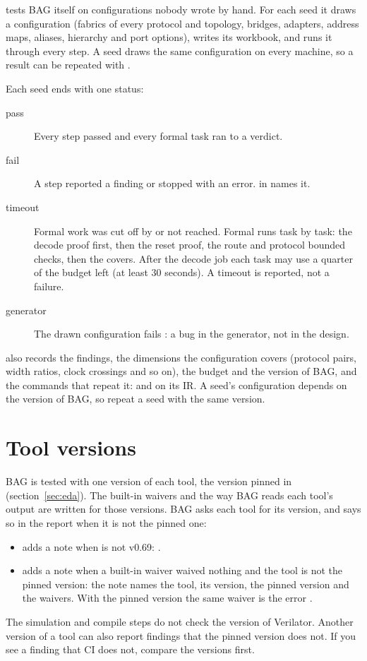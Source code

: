  tests BAG itself on configurations nobody wrote by hand. For each seed
it draws a configuration (fabrics of every protocol and topology, bridges, adapters,
address maps, aliases, hierarchy and port options), writes its workbook, and runs it
through every step. A seed draws the same configuration on every machine, so a result can
be repeated with .

Each seed ends with one status:

\begin{description}
\item[pass] Every step passed and every formal task ran to a verdict.
\item[fail] A step reported a finding or stopped with an error.  in
   names it.
\item[timeout] Formal work was cut off by  or not reached. Formal runs
  task by task: the decode proof first, then the reset proof, the route and protocol
  bounded checks, then the covers. After the decode job each task may use a quarter of the
  budget left (at least 30 seconds). A timeout is reported, not a failure.
\item[generator] The drawn configuration fails : a bug in the generator,
  not in the design.
\end{description}

 also records the findings, the dimensions the configuration covers
(protocol pairs, width ratios, clock crossings and so on), the budget and the version of
BAG, and the commands that repeat it:  and  on its
IR. A seed's configuration depends on the version of BAG, so repeat a seed with the same
version.

\section{Tool versions}
\label{sec:versions}

BAG is tested with one version of each tool, the version pinned in 
(section~\ref{sec:eda}). The built-in waivers and the way BAG reads each tool's output
are written for those versions. BAG asks each tool for its version, and says so in the
report when it is not the pinned one:

\begin{itemize}
\item {} adds a note when  is not v0.69:
  .
\item {} adds a note when a built-in waiver waived nothing and the tool is
  not the pinned version: the note names the tool, its version, the pinned version and
  the waivers. With the pinned version the same waiver is the error
  .
\end{itemize}

The simulation and compile steps do not check the version of Verilator. Another version
of a tool can also report findings that the pinned version does not. If you see a
finding that CI does not, compare the versions first.
